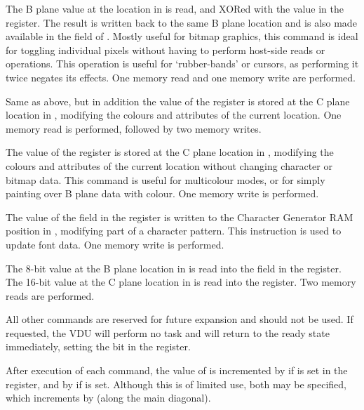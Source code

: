 \begin{description}
   The B plane value at
  the location in  is read, and XORed with the value in the
   register. The result is written back to the same B plane location
  and is also made available in the  field of . Mostly
  useful for bitmap graphics, this command is ideal for toggling individual
  pixels without having to perform host-side reads or 
  operations. This operation is useful for ‘rubber-bands’ or cursors, as
  performing it twice negates its effects. One memory read and one memory write
  are performed.

  Same as above, but in addition the value of the  register is
  stored at the C plane location in , modifying the colours and
  attributes of the current location. One memory read is performed, followed by
  two memory writes.

   The value of the 
  register is stored at the C plane location in , modifying the
  colours and attributes of the current location without changing character or
  bitmap data. This command is useful for multicolour modes, or for simply
  painting over B plane data with colour. One memory write is performed.

   The value of the
   field in the  register is written to the Character
  Generator RAM position in , modifying part of a character
  pattern. This instruction is used to update font data. One memory write is
  performed.

   The 8-bit value at the B plane
  location in  is read into the  field in the 
  register. The 16-bit value at the C plane location in  is read into
  the  register. Two memory reads are performed.

\end{description}

All other commands are reserved for future expansion and should not be used. If
requested, the VDU will perform no task and will return to the ready state
immediately, setting the  bit in the  register.

After execution of each command, the value of  is incremented by
 if  is set in the  register, and by 
if  is set. Although this is of limited use, both may be specified,
which increments  by  (along the main diagonal).

